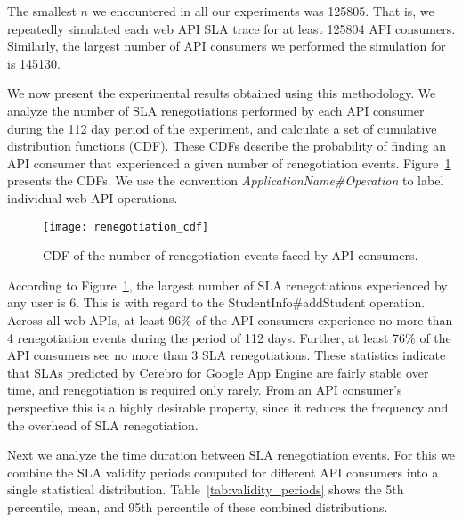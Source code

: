 The smallest $n$ we encountered in all our experiments was 125805. That is, we
repeatedly simulated each web API SLA trace 
for at least 125804 API consumers. Similarly, the largest number of API consumers 
we performed the simulation for is 145130.

We now present the experimental results obtained using this methodology. We
analyze the number of SLA renegotiations performed by each API consumer during the 112 day
period of the experiment, and calculate a set of cumulative distribution functions (CDF). These
CDFs describe the probability of finding an API consumer that experienced a given number of
renegotiation events. Figure~\ref{fig:renegotiation_cdf} presents the CDFs. We use the convention
\textit{ApplicationName\#Operation} to label individual web API operations.

\begin{figure}
\centering
\texttt{[image: renegotiation\_cdf]}
\caption{CDF of the number of renegotiation events faced by API consumers.}
\label{fig:renegotiation_cdf}
\end{figure}

According to Figure~\ref{fig:renegotiation_cdf}, the largest number of SLA renegotiations 
experienced by any user is 6. This is
with regard to the StudentInfo\#addStudent operation. Across all web APIs, at least 96\% of the API
consumers experience no more than 4 renegotiation events during the period of 112 days. Further,
at least 76\% of the API consumers see no more than 3 SLA renegotiations. These statistics
indicate that SLAs predicted by Cerebro for Google App Engine are fairly
stable over time, and renegotiation is required only rarely. From an API consumer's perspective
this is a highly desirable property, since it reduces the frequency and the 
overhead of SLA renegotiation.

Next we analyze the time duration between SLA renegotiation events. For this we combine the SLA validity
periods computed for different API consumers into a single statistical distribution. 
Table~\ref{tab:validity_periods} shows the 5th percentile, mean, and 95th percentile 
of these combined distributions. 

